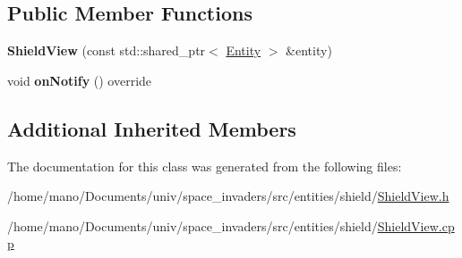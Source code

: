 \subsection*{Public Member Functions}
\begin{DoxyCompactItemize}
\item 
\mbox{\label{classentities_1_1shield_1_1ShieldView_ac2f9dbbdc6efd8a3453576c83d62a8fe}} 
{\bfseries Shield\+View} (const std\+::shared\+\_\+ptr$<$ \hyperlink{classentities_1_1Entity}{Entity} $>$ \&entity)
\item 
\mbox{\label{classentities_1_1shield_1_1ShieldView_ab1646d34b45e9007c12fbf03b81222f2}} 
void {\bfseries on\+Notify} () override
\end{DoxyCompactItemize}
\subsection*{Additional Inherited Members}


The documentation for this class was generated from the following files\+:\begin{DoxyCompactItemize}
\item 
/home/mano/\+Documents/univ/space\+\_\+invaders/src/entities/shield/\hyperlink{ShieldView_8h}{Shield\+View.\+h}\item 
/home/mano/\+Documents/univ/space\+\_\+invaders/src/entities/shield/\hyperlink{ShieldView_8cpp}{Shield\+View.\+cpp}\end{DoxyCompactItemize}
